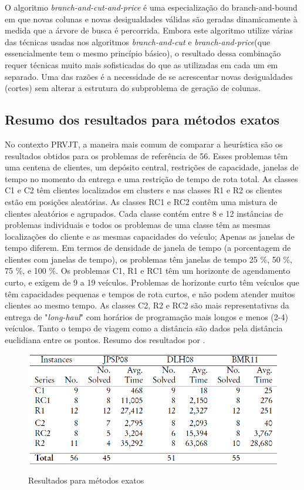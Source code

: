 O algoritmo \textit{branch-and-cut-and-price} é uma especialização do branch-and-bound em que novas colunas e novas desigualdades válidas são geradas dinamicamente à medida que a árvore de busca é percorrida. Embora este algoritmo utilize várias das técnicas usadas nos algoritmos \textit{branch-and-cut} e \textit{branch-and-price}(que essencialmente tem o mesmo princípio básico), o resultado dessa combinação requer técnicas muito mais sofisticadas do que as utilizadas em cada um em separado. Uma das razões é a necessidade de se acrescentar novas desigualdades (cortes) sem alterar a estrutura do subproblema de geração de colunas.


\subsection{Resumo dos resultados para métodos exatos} 
 
No contexto PRVJT, a maneira mais comum de comparar a heurística são os resultados obtidos para os problemas de referência de \cite{solomon87} 56. Esses problemas têm uma centena de clientes, um depósito central, restrições de capacidade, janelas de tempo no momento da entrega e uma restrição de tempo de rota total. As classes C1 e C2 têm clientes localizados em clusters e nas classes R1 e R2 os clientes estão em posições aleatórias. As classes RC1 e RC2 contêm uma mistura de clientes aleatórios e agrupados. Cada classe contém entre 8 e 12 instâncias de problemas individuais e todos os problemas de uma classe têm as mesmas localizações do cliente e as mesmas capacidades do veículo; Apenas as janelas de tempo diferem. Em termos de densidade de janela de tempo (a porcentagem de clientes com janelas de tempo), os problemas têm janelas de tempo 25 \%, 50 \%, 75 \%, e 100 \%. Os problemas C1, R1 e RC1 têm um horizonte de agendamento curto, e exigem de 9 a 19 veículos. Problemas de horizonte curto têm veículos que têm capacidades pequenas e tempos de rota curtos, e não podem atender muitos clientes ao mesmo tempo. As classes C2, R2 e RC2 são mais representativas da entrega de "\textit{long-haul}" com horários de programação mais longos e menos (2-4) veículos. Tanto o tempo de viagem como a distância são dados pela distância euclidiana entre os pontos.  Resumo dos resultados por \cite{azi12}.

\begin{figure}[ht!]
\centering
\includegraphics[scale=0.8]{figuras/rme.PNG}
\label{rme}
\caption{Resultados para métodos exatos}
\end{figure}

